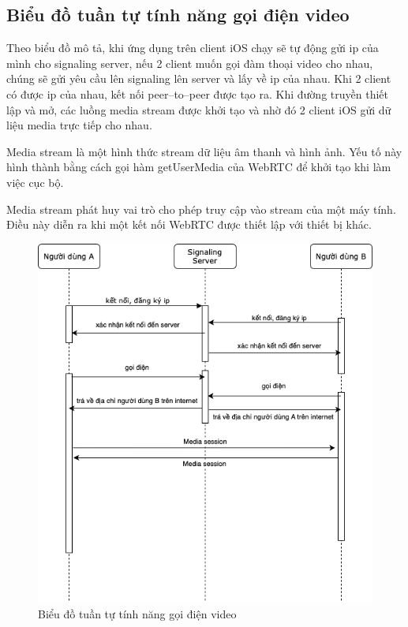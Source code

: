 \documentclass[../DoAn.tex]{subfiles}
\begin{document}
\subsection{Biểu đồ tuần tự tính năng gọi điện video}
Theo biểu đồ mô tả, khi ứng dụng trên client iOS chạy sẽ tự động gửi ip của mình cho signaling server, nếu 2 client muốn gọi đàm thoại video cho nhau, chúng sẽ gửi yêu cầu lên signaling lên server và lấy về ip của nhau. Khi 2 client có được ip của nhau, kết nối peer–to–peer được tạo ra. Khi đường truyền thiết lập và mở, các luồng media stream được khởi tạo và nhờ đó 2 client iOS gửi dữ liệu media trực tiếp cho nhau.

Media stream là một hình thức stream dữ liệu âm thanh và hình ảnh. Yếu tố này hình thành bằng cách gọi hàm getUserMedia của WebRTC để khởi tạo khi làm việc cục bộ.

Media stream phát huy vai trò cho phép truy cập vào stream của một máy tính. Điều này diễn ra khi một kết nối WebRTC được thiết lập với thiết bị khác.
\begin{figure}[H]
    \centering
    \includegraphics[width=1\linewidth]{Hinhve/Sequence/Sequence_Call_Video.png}
    \caption{Biểu đồ tuần tự tính năng gọi điện video}
    \label{fig:use_case_tổng_quan}
\end{figure}
\end{document}
